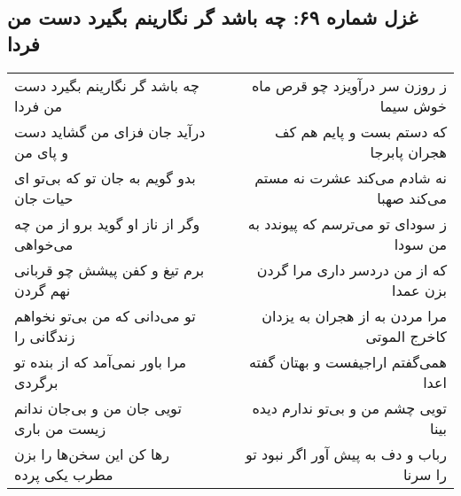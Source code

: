 \begin{center}
\section*{غزل شماره ۶۹: چه باشد گر نگارینم بگیرد دست من فردا}
\label{sec:0069}
\begin{longtable}{l p{0.5cm} r}
چه باشد گر نگارینم بگیرد دست من فردا
&&
ز روزن سر درآویزد چو قرص ماه خوش سیما
\\
درآید جان فزای من گشاید دست و پای من
&&
که دستم بست و پایم هم کف هجران پابرجا
\\
بدو گویم به جان تو که بی‌تو ای حیات جان
&&
نه شادم می‌کند عشرت نه مستم می‌کند صهبا
\\
وگر از ناز او گوید برو از من چه می‌خواهی
&&
ز سودای تو می‌ترسم که پیوندد به من سودا
\\
برم تیغ و کفن پیشش چو قربانی نهم گردن
&&
که از من دردسر داری مرا گردن بزن عمدا
\\
تو می‌دانی که من بی‌تو نخواهم زندگانی را
&&
مرا مردن به از هجران به یزدان کاخرج الموتی
\\
مرا باور نمی‌آمد که از بنده تو برگردی
&&
همی‌گفتم اراجیفست و بهتان گفته اعدا
\\
تویی جان من و بی‌جان ندانم زیست من باری
&&
تویی چشم من و بی‌تو ندارم دیده بینا
\\
رها کن این سخن‌ها را بزن مطرب یکی پرده
&&
رباب و دف به پیش آور اگر نبود تو را سرنا
\\
\end{longtable}
\end{center}
